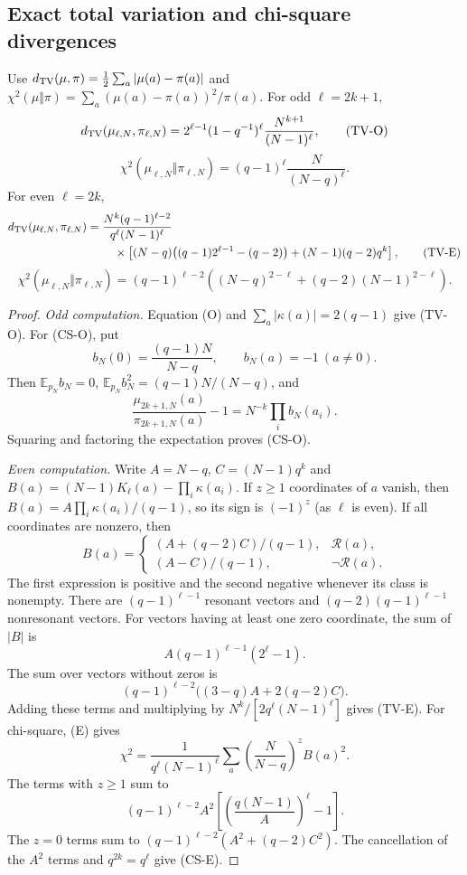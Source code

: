\subsection{Exact total variation and chi-square divergences}
\begin{theorem}\label{thm:distances}
Use
$d_{\rm TV}(\mu,\pi)=\frac12\sum_a|\mu(a)-\pi(a)|$ and
$\chi^2(\mu\Vert\pi)=\sum_a(\mu(a)-\pi(a))^2/\pi(a)$.
For odd $\ell=2k+1$,
\[
 d_{\rm TV}(\mu_{\ell,N},\pi_{\ell,N})=
 2^{\ell-1}(1-q^{-1})^\ell\frac{N^{k+1}}{(N-1)^\ell},
\tag{TV-O}
\]
\[
 \chi^2(\mu_{\ell,N}\Vert\pi_{\ell,N})
 =(q-1)^\ell\frac{N}{(N-q)^\ell}.
\tag{CS-O}
\]
For even $\ell=2k$,
\begin{align*}
 d_{\rm TV}(\mu_{\ell,N},\pi_{\ell,N})
 ={}&\frac{N^k(q-1)^{\ell-2}}{q^\ell(N-1)^\ell}\\
 &\quad\times\left[
 (N-q)\bigl((q-1)2^{\ell-1}-(q-2)\bigr)
 +(N-1)(q-2)q^k\right],
\tag{TV-E}
\end{align*}
\[
 \chi^2(\mu_{\ell,N}\Vert\pi_{\ell,N})
 =(q-1)^{\ell-2}
 \left((N-q)^{2-\ell}+(q-2)(N-1)^{2-\ell}\right).
\tag{CS-E}
\]

\end{theorem}
\begin{proof}
\textit{Odd computation.}
Equation (O) and $\sum_a|\kappa(a)|=2(q-1)$ give (TV-O).
For (CS-O), put
\[
 b_N(0)=\frac{(q-1)N}{N-q},\qquad b_N(a)=-1\ (a\ne0).
\]
Then $\mathbb E_{p_N}b_N=0$,
$\mathbb E_{p_N}b_N^2=(q-1)N/(N-q)$, and
\[
 \frac{\mu_{2k+1,N}(a)}{\pi_{2k+1,N}(a)}-1
 =N^{-k}\prod_i b_N(a_i).
\]
Squaring and factoring the expectation proves (CS-O).

\textit{Even computation.}
Write $A=N-q$, $C=(N-1)q^k$ and
$B(a)=(N-1)K_\ell(a)-\prod_i\kappa(a_i)$.
If $z\ge1$ coordinates of $a$ vanish, then
$B(a)=A\prod_i\kappa(a_i)/(q-1)$, so its sign is
$(-1)^z$ (as $\ell$ is even).
If all coordinates are nonzero, then
\[
 B(a)=\begin{cases}(A+(q-2)C)/(q-1),&\mathcal R(a),\\
 (A-C)/(q-1),&\neg\mathcal R(a).
 \end{cases}
\]
The first expression is positive and the second negative whenever its
class is nonempty. There are $(q-1)^{\ell-1}$ resonant vectors and
$(q-2)(q-1)^{\ell-1}$ nonresonant vectors.
For vectors having at least one zero coordinate, the sum of $|B|$ is
\[
 A(q-1)^{\ell-1}(2^\ell-1).
\]
The sum over vectors without zeros is
\[
 (q-1)^{\ell-2}\bigl((3-q)A+2(q-2)C\bigr).
\]
Adding these terms and multiplying by
$N^k/[2q^\ell(N-1)^\ell]$ gives (TV-E).
For chi-square, (E) gives
\[
 \chi^2=\frac1{q^\ell(N-1)^\ell}
 \sum_a\left(\frac N{N-q}\right)^zB(a)^2.
\]
The terms with $z\ge1$ sum to
\[
 (q-1)^{\ell-2}A^2
 \left[\left(\frac{q(N-1)}A\right)^\ell-1\right].
\]
The $z=0$ terms sum to
$(q-1)^{\ell-2}(A^2+(q-2)C^2)$.
The cancellation of the $A^2$ terms and $q^{2k}=q^\ell$ give (CS-E).
\end{proof}

